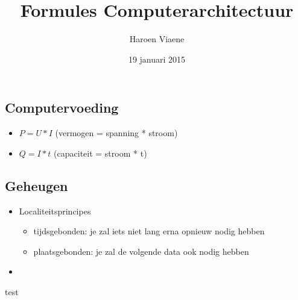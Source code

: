\documentclass[11pt]{article}
\title{Formules Computerarchitectuur}
\author{Haroen Viaene}
\date{19 januari 2015}
\let\originalitem\item
\renewcommand{\item}{\originalitem[]}
\newcommand{\Newpage}{\end{preview}\begin{preview}}
\begin{document}
\begin{preview}


\maketitle

\Newpage

\section{Computervoeding}

\begin{itemize}
	\item $P = U * I$ (vermogen = spanning * stroom)
	\item $Q = I * t$ (capaciteit = stroom * t)
\end{itemize}

\Newpage

\section{Geheugen}

\begin{itemize}
	\item Localiteitsprincipes
	\begin{itemize}
		\item tijdsgebonden: je zal iets niet lang erna opnieuw nodig hebben
		\item plaatsgebonden: je zal de volgende data ook nodig hebben
	\end{itemize}
	\item 
\end{itemize}

\begin{itemize}
	test 
\end{itemize}

\end{preview}
\end{document}
